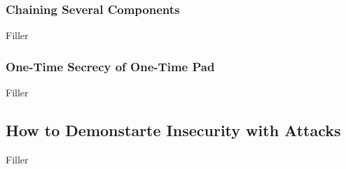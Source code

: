 \documentclass{article}
\begin{document}
\begin{adjustwidth}{2em}{}
\begin{adjustwidth}{2em}{}
				\subsubsection{Chaining Several Components}
				\begin{adjustwidth}{2em}{}
				Filler
				\end{adjustwidth}
				\subsubsection{One-Time Secrecy of One-Time Pad}
				\begin{adjustwidth}{2em}{}
				Filler
				\end{adjustwidth}
			\end{adjustwidth}
			\subsection{How to Demonstarte Insecurity with Attacks}
			\begin{adjustwidth}{2em}{}
			Filler
			\end{adjustwidth}
		\end{adjustwidth}
	
\end{document}
